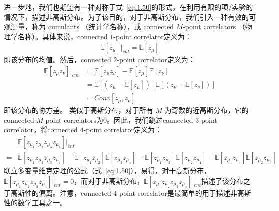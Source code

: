 进一步地，我们也期望有一种对称于式~\eqref{eq:1.50}的形式，在利用有限的项/实验的情况下，描述非高斯分布。为了该目的，对于非高斯分布，我们引入一种有效的可观测量，称为 cumulants （统计学名称），或 connected $M$-point correlators （物理学名称）。具体来说，connected $1$-point correlator定义为：
\begin{equation}
    \begin{split}
        \mathbb{E}[z_\mu] |_{cnt} = \mathbb{E}[z_\mu]
    \end{split}
\end{equation}
即该分布的均值。然后，connected $2$-point correlator定义为：
\begin{equation}
    \begin{split}
        \mathbb{E}[z_\mu z_\nu]|_{cnt} &= \mathbb{E}[z_\mu z_\nu] - \mathbb{E}[z_\mu]\mathbb{E}[z_\nu] \\
        &= \mathbb{E}[(z_\mu-\mathbb{E}[z_\mu])]\mathbb{E}[(z_\nu-\mathbb{E}[z_\nu])] \\
        &= Conv[z_\mu, z_\nu]
    \end{split}
\end{equation}
即该分布的协方差。
类似于高斯分布，对于所有 $M$ 为奇数的近高斯分布，它的connected $M$-point correlators为$0$。因此，我们跳过connected $3$-point correlator，将connected $4$-point correlator定义为：
\begin{equation}
    \begin{split}
        & \mathbb{E}[z_{\mu_1}z_{\mu_2}z_{\mu_3}z_{\mu_4}]|_{cnt} \\
        = &  
        \mathbb{E}[z_{\mu_1}z_{\mu_2}z_{\mu_3}z_{\mu_4}]  
        - \mathbb{E}[z_{\mu_1}z_{\mu_2}]\mathbb{E}[z_{\mu_3}z_{\mu_4}]
        - \mathbb{E}[z_{\mu_1}z_{\mu_3}]\mathbb{E}[z_{\mu_2}z_{\mu_4}]
        - \mathbb{E}[z_{\mu_1}z_{\mu_4}]\mathbb{E}[z_{\mu_2}z_{\mu_3}]
    \end{split}
\end{equation}
联立多变量维克定理的公式（式~\eqref{eq:1.50}），易得，对于高斯分布，$\mathbb{E}[z_{\mu_1}z_{\mu_2}z_{\mu_3}z_{\mu_4}]|_{cnt}=0$，而对于非高斯分布，$\mathbb{E}[z_{\mu_1}z_{\mu_2}z_{\mu_3}z_{\mu_4}]|_{cnt}$描述了该分布之于高斯性的偏离。注意，connected $4$-point correlator是最简单的用于描述非高斯性的数学工具之一。

